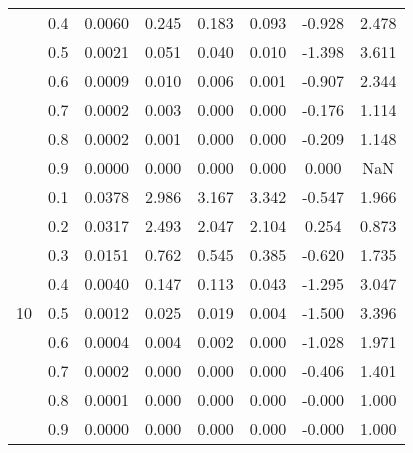 \documentclass[11pt,a4paper]{report}
\begin{document}
\begin{longtable}{ | c | c || c | c | c | c | c | c | }
 & 0.4 & 0.0060 & 0.245 & 0.183 & 0.093 & -0.928 & 2.478 \\
 & 0.5 & 0.0021 & 0.051 & 0.040 & 0.010 & -1.398 & 3.611 \\
 & 0.6 & 0.0009 & 0.010 & 0.006 & 0.001 & -0.907 & 2.344 \\
 & 0.7 & 0.0002 & 0.003 & 0.000 & 0.000 & -0.176 & 1.114 \\
 & 0.8 & 0.0002 & 0.001 & 0.000 & 0.000 & -0.209 & 1.148 \\
 & 0.9 & 0.0000 & 0.000 & 0.000 & 0.000 & 0.000 & NaN \\
 \hline
\multirow{9}{*}{10} & 0.1 & 0.0378 & 2.986 & 3.167 & 3.342 & -0.547 & 1.966 \\
 & 0.2 & 0.0317 & 2.493 & 2.047 & 2.104 & 0.254 & 0.873 \\
 & 0.3 & 0.0151 & 0.762 & 0.545 & 0.385 & -0.620 & 1.735 \\
 & 0.4 & 0.0040 & 0.147 & 0.113 & 0.043 & -1.295 & 3.047 \\
 & 0.5 & 0.0012 & 0.025 & 0.019 & 0.004 & -1.500 & 3.396 \\
 & 0.6 & 0.0004 & 0.004 & 0.002 & 0.000 & -1.028 & 1.971 \\
 & 0.7 & 0.0002 & 0.000 & 0.000 & 0.000 & -0.406 & 1.401 \\
 & 0.8 & 0.0001 & 0.000 & 0.000 & 0.000 & -0.000 & 1.000 \\
 & 0.9 & 0.0000 & 0.000 & 0.000 & 0.000 & -0.000 & 1.000 \\
 \hline
\hline
\end{longtable}
\end{document}
